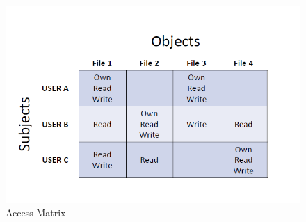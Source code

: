 \documentclass{article}
\begin{document}
                \begin{figure}[h]
                    \begin{center}
                        \includegraphics[scale=0.5]{../immagini/access_matrix.png}
                    \end{center}
                    \caption{Access Matrix} 
                \end{figure}
\end{document}
